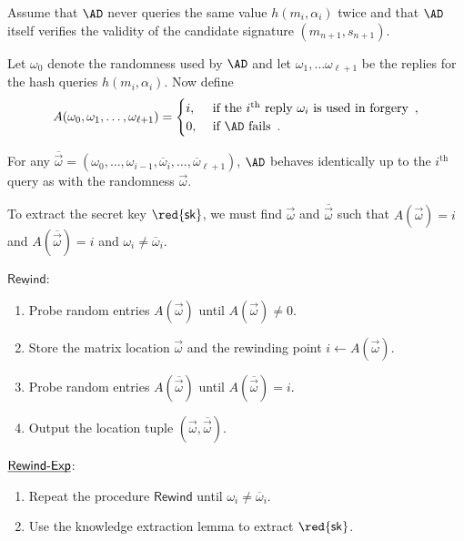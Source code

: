 \documentclass[landscape,footrule]{foils}
\renewcommand{\SK}{{\red{\mathsf{sk}}}}
\begin{document}

Assume that $\AD$ never queries the same value $h(m_i,\alpha_i)$ twice
and that $\AD$ itself verifies the validity of the candidate signature
$(m_{n+1},s_{n+1})$.

Let $\omega_0$ denote the randomness used by $\AD$ and let
$\omega_1,\ldots \omega_{\ell+1}$ be the replies for the hash queries
$h(m_i,\alpha_i)$. Now define
\begin{align*}
A(\omega_0,\omega_1,\ldots,\omega_{\ell+1})=  
 \begin{cases}
   i,&\text{ if the }i^{\text{th}}\text{ reply $\omega_i$ is used in forgery}\enspace,\\
   0,&\text{ if }\AD \text{ fails}\enspace.
 \end{cases}
\end{align*}
\begin{triangles}
\item For any
  $\overline{\vec{\omega}}=(\omega_0,\ldots,\omega_{i-1},\overline{\omega}_i,\ldots,\overline{\omega}_{\ell+1})$,
  $\AD$ behaves identically up to the $i^{\text{th}}$ query as with
  the randomness $\vec{\omega}$.
\item To extract the secret key $\SK$, we must find $\vec{\omega}$ and
  $\overline{\vec{\omega}}$ such that
  $A(\vec{\omega})=i$ and $A(\overline{\vec{\omega}})=i$ and $\omega_i\neq\overline{\omega}_{i}$.
\end{triangles}


$\underline{\mathsf{Rewind}}$:
\begin{enumerate}
 \item Probe random entries $A(\vec{\omega})$ until $A(\vec{\omega})\neq 0$.
 \item Store the matrix location $\vec{\omega}$ and the rewinding point $i\gets A(\vec{\omega})$.
 \item Probe random entries $A(\overline{\vec{\omega}})$ until $A(\overline{\vec{\omega}})=i$.
 \item Output the location tuple $(\vec{\omega},\overline{\vec{\omega}})$.
\end{enumerate}
\Bigskip

$\underline{\smash{\mathsf{Rewind\text{-}Exp}}}$:
\begin{enumerate}
  \item Repeat the procedure $\mathsf{Rewind}$ until $\omega_i\neq\overline{\omega}_i$.
  \item Use the knowledge extraction lemma to extract $\SK$.
\end{enumerate}
\end{document}
